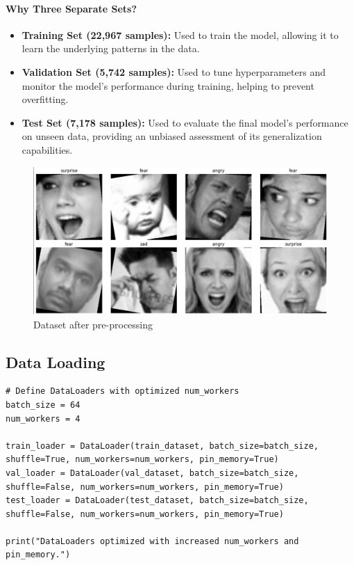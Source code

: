 \documentclass{article}
\begin{document}
\paragraph{Why Three Separate Sets?}

\begin{itemize}
    \item \textbf{Training Set (22,967 samples):} Used to train the model, allowing it to learn the underlying patterns in the data.
    \item \textbf{Validation Set (5,742 samples):} Used to tune hyperparameters and monitor the model's performance during training, helping to prevent overfitting.
    \item \textbf{Test Set (7,178 samples):} Used to evaluate the final model's performance on unseen data, providing an unbiased assessment of its generalization capabilities.
\end{itemize}

\begin{figure}[htbp]
    \centering
    \includegraphics[width=\textwidth]{transformed_images.png}
    \caption{Dataset after pre-processing}
    \label{fig:transformed_images}
\end{figure}

\subsection*{Data Loading}

\begin{verbatim}
# Define DataLoaders with optimized num_workers
batch_size = 64
num_workers = 4
    
train_loader = DataLoader(train_dataset, batch_size=batch_size, shuffle=True, num_workers=num_workers, pin_memory=True)
val_loader = DataLoader(val_dataset, batch_size=batch_size, shuffle=False, num_workers=num_workers, pin_memory=True)
test_loader = DataLoader(test_dataset, batch_size=batch_size, shuffle=False, num_workers=num_workers, pin_memory=True)
    
print("DataLoaders optimized with increased num_workers and pin_memory.")
\end{verbatim}
\end{document}
